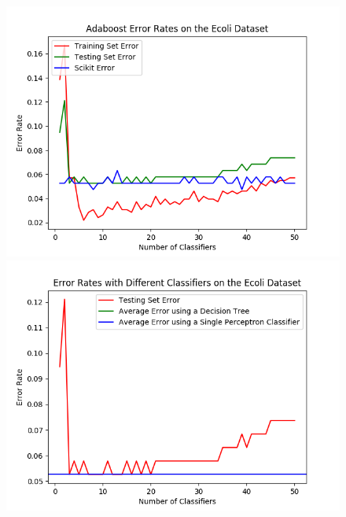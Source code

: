 \documentclass{article}
\begin{document}
\begin{figure}[hbt]
\centering
\includegraphics[scale=0.7]{Ecoli_1}
\includegraphics[scale=0.7]{Ecoli_different_classifiers_1} 
\caption{}
\end{figure}
\end{document}
